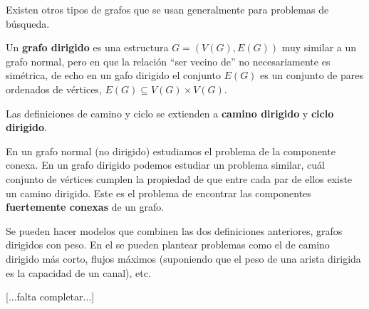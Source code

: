 Existen otros tipos de grafos que se usan generalmente para problemas de búsqueda.

\begin{definicion}
Un {\bf grafo dirigido} es una estructura $G=(V(G),E(G))$ muy similar a un grafo normal, pero en que la relación ``ser vecino de'' no necesariamente es simétrica, de echo en un gafo dirigido el conjunto $E(G)$ es un conjunto de pares ordenados de vértices, $E(G)\subseteq V(G)\times V(G)$.

Las definiciones de camino y ciclo se extienden a {\bf camino dirigido} y {\bf ciclo dirigido}.
\end{definicion}

En un grafo normal (no dirigido) estudiamos el problema de la componente conexa.
En un grafo dirigido podemos estudiar un problema similar, cuál conjunto de vértices cumplen la propiedad de que entre cada par de ellos existe un camino dirigido.
Este es el problema de encontrar las componentes {\bf fuertemente conexas} de un grafo.

Se pueden hacer modelos que combinen las dos definiciones anteriores, grafos dirigidos con peso. 
En el se pueden plantear problemas como el de camino dirigido más corto, flujos máximos (suponiendo que el peso de una arista dirigida es la capacidad de un canal), etc.

[...falta completar...]

